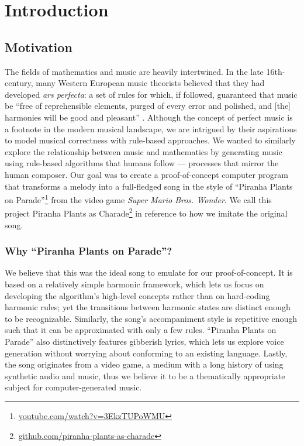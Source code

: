 \section{Introduction}

\subsection{Motivation}

The fields of mathematics and music are heavily intertwined. In the late 16th-century, many Western European music theorists believed that they had developed \emph{ars perfecta}: a set of rules for which, if followed, guaranteed that music be ``free of reprehensible elements, purged of every error and polished, and [the] harmonies will be good and pleasant'' \autocite{Richard:2005}. Although the concept of perfect music is a footnote in the modern musical landscape, we are intrigued by their aspirations to model musical correctness with rule-based approaches. We wanted to similarly explore the relationship between music and mathematics by generating music using rule-based algorithms that humans follow --- processes that mirror the human composer. Our goal was to create a proof-of-concept computer program that transforms a melody into a full-fledged song in the style of ``Piranha Plants on Parade''\footnote{\href{https://www.youtube.com/watch?v=3EkzTUPoWMU}{youtube.com/watch?v=3EkzTUPoWMU}} from the video game \emph{Super Mario Bros. Wonder}. We call this project Piranha Plants as Charade\footnote{\href{https://github.com/piranha-plants-as-charade}{github.com/piranha-plants-as-charade}} in reference to how we imitate the original song.

\subsubsection{Why ``Piranha Plants on Parade''?}

We believe that this was the ideal song to emulate for our proof-of-concept. It is based on a relatively simple harmonic framework, which lets us focus on developing the algorithm's high-level concepts rather than on hard-coding harmonic rules; yet the transitions between harmonic states are distinct enough to be recognizable. Similarly, the song's accompaniment style is repetitive enough such that it can be approximated with only a few rules. ``Piranha Plants on Parade'' also distinctively features gibberish lyrics, which lets us explore voice generation without worrying about conforming to an existing language. Lastly, the song originates from a video game, a medium with a long history of using synthetic audio and music, thus we believe it to be a thematically appropriate subject for computer-generated music.

